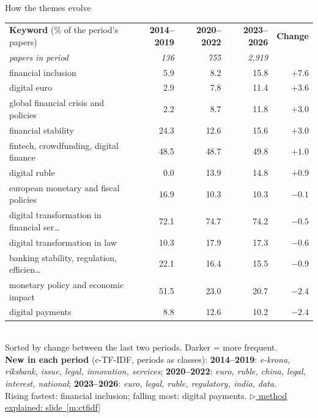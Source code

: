 \documentclass[aspectratio=169,10pt]{beamer}
\newcommand{\method}[1]{\hfill\hyperref[#1]{\tiny\textcolor{c4}{$\triangleright$ method explained: slide~\ref*{#1}}}}
\begin{document}
\begin{frame}{How the themes evolve}
\scriptsize
\begin{tabular}{@{}p{}rrrr@{}}\toprule
\textbf{Keyword} (\% of the period's papers) & \textbf{2014--2019} & \textbf{2020--2022} & \textbf{2023--2026} & \textbf{Change}\\
\textit{papers in period} & \textit{136} & \textit{755} & \textit{2,919} &\\\midrule
financial inclusion & \cellcolor{c1!5}5.9 & \cellcolor{c1!8}8.2 & \cellcolor{c1!15}15.8 & \textcolor{c4}{$+7.6$} \\
digital euro & \cellcolor{c1!2}2.9 & \cellcolor{c1!7}7.8 & \cellcolor{c1!11}11.4 & \textcolor{c4}{$+3.6$} \\
global financial crisis and policies & \cellcolor{c1!2}2.2 & \cellcolor{c1!8}8.7 & \cellcolor{c1!11}11.8 & \textcolor{c4}{$+3.0$} \\
financial stability & \cellcolor{c1!24}24.3 & \cellcolor{c1!12}12.6 & \cellcolor{c1!15}15.6 & \textcolor{c4}{$+3.0$} \\
fintech, crowdfunding, digital finance & \cellcolor{c1!48}48.5 & \cellcolor{c1!48}48.7 & \cellcolor{c1!49}49.8 & \textcolor{c4}{$+1.0$} \\
digital ruble & \cellcolor{c1!0}0.0 & \cellcolor{c1!13}13.9 & \cellcolor{c1!14}14.8 & \textcolor{c4}{$+0.9$} \\
european monetary and fiscal policies & \cellcolor{c1!16}16.9 & \cellcolor{c1!10}10.3 & \cellcolor{c1!10}10.3 & \textcolor{c2}{$-0.1$} \\
digital transformation in financial ser\dots{} & \cellcolor{c1!60}72.1 & \cellcolor{c1!60}74.7 & \cellcolor{c1!60}74.2 & \textcolor{c2}{$-0.5$} \\
digital transformation in law & \cellcolor{c1!10}10.3 & \cellcolor{c1!17}17.9 & \cellcolor{c1!17}17.3 & \textcolor{c2}{$-0.6$} \\
banking stability, regulation, efficien\dots{} & \cellcolor{c1!22}22.1 & \cellcolor{c1!16}16.4 & \cellcolor{c1!15}15.5 & \textcolor{c2}{$-0.9$} \\
monetary policy and economic impact & \cellcolor{c1!51}51.5 & \cellcolor{c1!23}23.0 & \cellcolor{c1!20}20.7 & \textcolor{c2}{$-2.4$} \\
digital payments & \cellcolor{c1!8}8.8 & \cellcolor{c1!12}12.6 & \cellcolor{c1!10}10.2 & \textcolor{c2}{$-2.4$} \\
\bottomrule\end{tabular}\\[4pt]
Sorted by change between the last two periods. Darker = more frequent.\\[3pt]
\textbf{New in each period} (c-TF-IDF, periods as classes): \textbf{2014--2019}: \emph{e-krona, riksbank, issue, legal, innovation, services}; \textbf{2020--2022}: \emph{euro, ruble, china, legal, interest, national}; \textbf{2023--2026}: \emph{euro, legal, ruble, regulatory, india, data}.\\[2pt]
\small Rising fastest: \alert{financial inclusion}; falling most: \alert{digital payments}.
\method{m:ctfidf}
\end{frame}
\end{document}
